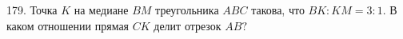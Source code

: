 179. Точка $K$ на медиане $BM$ треугольника $ABC$ такова, что $BK:KM=3:1.$ В каком отношении прямая $CK$ делит отрезок $AB?$\\
